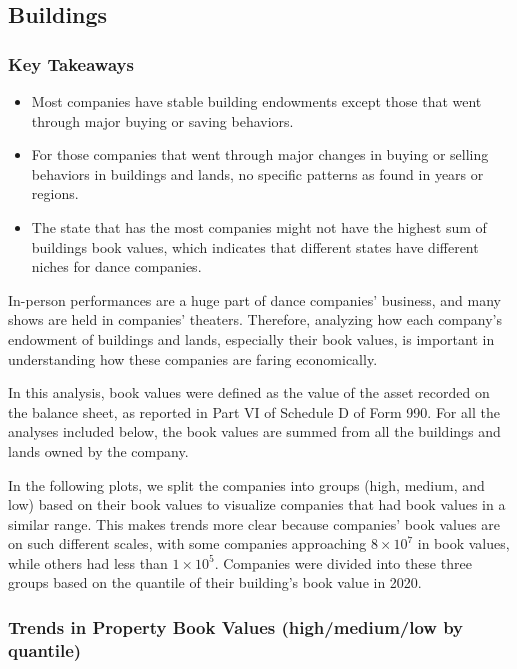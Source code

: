 \documentclass[Dance Data
Project,article,submit,moreauthors,pdftex]{mdpi}
\providecommand{\tightlist}{%
  \setlength{\itemsep}{0pt}\setlength{\parskip}{0pt}}
\begin{document}
\hypertarget{buildings}{%
\subsection{Buildings}\label{buildings}}

\hypertarget{key-takeaways-2}{%
\subsubsection{Key Takeaways}\label{key-takeaways-2}}

\begin{itemize}
\tightlist
\item
  Most companies have stable building endowments except those that went
  through major buying or saving behaviors.\\
\item
  For those companies that went through major changes in buying or
  selling behaviors in buildings and lands, no specific patterns as
  found in years or regions.\\
\item
  The state that has the most companies might not have the highest sum
  of buildings book values, which indicates that different states have
  different niches for dance companies.
\end{itemize}

In-person performances are a huge part of dance companies' business, and
many shows are held in companies' theaters. Therefore, analyzing how
each company's endowment of buildings and lands, especially their book
values, is important in understanding how these companies are faring
economically.

In this analysis, book values were defined as the value of the asset
recorded on the balance sheet, as reported in Part VI of Schedule D of
Form 990. For all the analyses included below, the book values are
summed from all the buildings and lands owned by the company.

In the following plots, we split the companies into groups (high,
medium, and low) based on their book values to visualize companies that
had book values in a similar range. This makes trends more clear because
companies' book values are on such different scales, with some companies
approaching \(8 \times 10^7\) in book values, while others had less than
\(1 \times 10^5\). Companies were divided into these three groups based
on the quantile of their building's book value in 2020.

\hypertarget{trends-in-property-book-values-highmediumlow-by-quantile}{%
\subsubsection{Trends in Property Book Values (high/medium/low by
quantile)}\label{trends-in-property-book-values-highmediumlow-by-quantile}}
\end{document}
